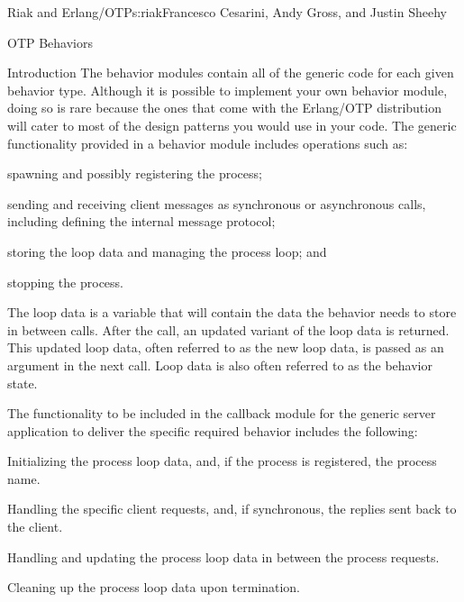 \begin{aosachapter}{Riak and Erlang/OTP}{s:riak}{Francesco Cesarini, Andy Gross, and Justin Sheehy}
\begin{aosasect1}{OTP Behaviors}
\begin{aosasect2}{Introduction}
The behavior modules contain all of the generic code for each given
behavior type. Although it is possible to implement your own behavior
module, doing so is rare because the ones that come with the
Erlang/OTP distribution will cater to most of the design patterns you
would use in your code. The generic functionality provided in a
behavior module includes operations such as:

\begin{aosaitemize}

  \item spawning and possibly registering the process;

  \item sending and receiving client messages as synchronous or
  asynchronous calls, including defining the internal message protocol;

  \item storing the loop data and managing the process loop; and

  \item stopping the process.

\end{aosaitemize}

The loop data is a variable that will contain the data the behavior
needs to store in between calls. After the call, an updated variant of
the loop data is returned. This updated loop data, often referred to
as the new loop data, is passed as an argument in the next call. Loop
data is also often referred to as the behavior state.

The functionality to be included in the callback module for the
generic server application to deliver the specific required behavior
includes the following:

\begin{aosaitemize}

  \item Initializing the process loop data, and, if the process is
  registered, the process name.

  \item Handling the specific client requests, and, if synchronous, the
  replies sent back to the client.

  \item Handling and updating the process loop data in between the
  process requests.

  \item Cleaning up the process loop data upon termination.

\end{aosaitemize}


\end{aosasect2}
\end{aosasect1}
\end{aosachapter}
